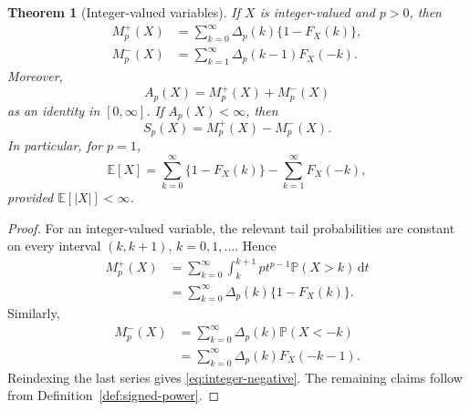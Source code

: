 \documentclass[10pt,a4paper]{amsart}
\newtheorem{theorem}{Theorem}
\newcommand{\E}{\mathbb{E}}
\newcommand{\Pp}{\mathbb{P}}
\newcommand{\abs}[1]{\left\lvert #1\right\rvert}
\newcommand{\dd}{\,\mathrm{d}}
\begin{document}
\begin{theorem}[Integer-valued variables]\label{thm:integer}
If $X$ is integer-valued and $p>0$, then
\begin{align}
  M_p^+(X)
  &=\sum_{k=0}^\infty \Delta_p(k)\{1-F_X(k)\},
  \label{eq:integer-positive}\\
  M_p^-(X)
  &=\sum_{k=1}^\infty \Delta_p(k-1)F_X(-k).
  \label{eq:integer-negative}
\end{align}
Moreover,
\[
  A_p(X)=M_p^+(X)+M_p^-(X)
\]
as an identity in $[0,\infty]$.  If $A_p(X)<\infty$, then
\[
  S_p(X)=M_p^+(X)-M_p^-(X).
\]
In particular, for $p=1$,
\begin{equation}\label{eq:integer-mean}
  \E[X]
  =\sum_{k=0}^\infty\{1-F_X(k)\}
   -\sum_{k=1}^\infty F_X(-k),
\end{equation}
provided $\E[\abs X]<\infty$.
\end{theorem}

\begin{proof}
For an integer-valued variable, the relevant tail probabilities are constant
on every interval $(k,k+1)$, $k=0,1,\ldots$.  Hence
\begin{align*}
  M_p^+(X)
  &=\sum_{k=0}^\infty
    \int_k^{k+1}p t^{p-1}\Pp(X>k)\dd t\\
  &=\sum_{k=0}^\infty\Delta_p(k)\{1-F_X(k)\}.
\end{align*}
Similarly,
\begin{align*}
  M_p^-(X)
  &=\sum_{k=0}^\infty
    \Delta_p(k)\Pp(X<-k)\\
  &=\sum_{k=0}^\infty\Delta_p(k)F_X(-k-1).
\end{align*}
Reindexing the last series gives \eqref{eq:integer-negative}.  The remaining
claims follow from Definition~\ref{def:signed-power}.
\end{proof}
\end{document}
